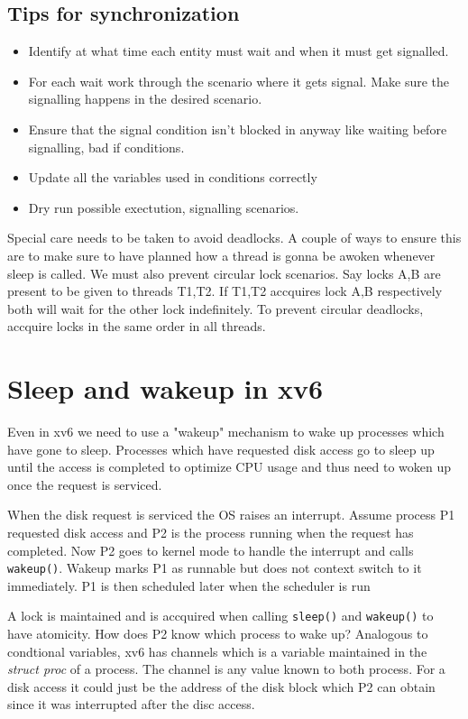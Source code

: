 \documentclass[12pt]{article}
\begin{document}
\subsection{Tips for synchronization}
\begin{itemize}[topsep=0pt, partopsep=0pt, itemsep=0pt, parsep=0pt]
    \item Identify at what time each entity must wait and when it must get signalled.
    \item For each wait work through the scenario where it gets signal. Make sure the signalling happens in the desired scenario. 
    \item Ensure that the signal condition isn't blocked in anyway like waiting before signalling, bad if conditions. 
    \item Update all the variables used in conditions correctly
    \item Dry run possible exectution, signalling scenarios.  
\end{itemize}

Special care needs to be taken to avoid deadlocks. A couple of ways to ensure this are to make sure to have planned how a 
thread is gonna be awoken whenever sleep is called. We must also prevent circular lock scenarios. Say locks A,B are present to be given to threads T1,T2. If 
T1,T2 accquires lock A,B respectively both will wait for the other lock indefinitely. To prevent circular deadlocks, accquire locks in the same order in all threads.  


\section{Sleep and wakeup in xv6}
Even in xv6 we need to use a "wakeup" mechanism to wake up processes which have gone to sleep. Processes which have requested disk access go to sleep up 
until the access is completed to optimize CPU usage and thus need to woken up once the request is serviced. 

When the disk request is serviced the OS raises an interrupt. Assume process P1 requested disk access and P2 is the process running when the request has completed. 
Now P2 goes to kernel mode to handle the interrupt and calls \texttt{wakeup()}. Wakeup marks P1 as runnable but does not context switch to it immediately. P1 is then scheduled later when the scheduler is 
run

A lock is maintained and is accquired when calling \texttt{sleep()} {and} \texttt{wakeup()} to have atomicity. How does P2 know which process to wake up? Analogous to condtional variables, xv6 has channels which 
is a variable maintained in the \textit{struct proc} of a process. The channel is any value known to both process. For a disk access it could just be the address of the disk block which P2 can obtain since it was interrupted after 
the disc access.
\end{document}
